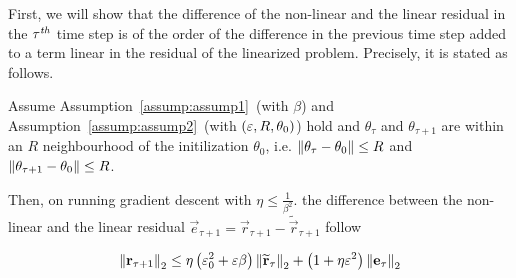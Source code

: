 \documentclass[a4paper]{article}
\let\temp\epsilon
\let\epsilon\varepsilon
\let\varepsilon\temp
\begin{document}
First, we will show that the difference of the non-linear and the
linear residual in the $\tau^{\it th}$ time step is of the order of
the difference in the previous time step added to a term linear in the
residual of the linearized problem. Precisely, it is stated as
follows.

\begin{lem}[Lemma 6.7]\label{lem:pert-one-step}
  Assume Assumption~\ref{assump:assump1}~(with $\beta$) and
  Assumption~\ref{assump:assump2}~(with $\br{\epsilon,R,\theta_0}$) hold and
  $\theta_\tau$ and $\theta_{\tau + 1}$ are within an $R$
  neighbourhood of the initilization $\theta_0$,
  i.e. $\mathrm{\left\lVert\theta_\tau - \theta_0\right\rVert}\le R$ and
  $\mathrm{\left\lVert\theta_{\tau+1}- \theta_0\right\rVert}\le R$.

  Then, on running gradient
  descent with $\eta\le \frac{1}{\beta^2}$. the difference between the
  non-linear and the linear residual $\vec{e}_{\tau+1} =
  \vec{r}_{\tau+1} - \widetilde{\vec{r}}_{\tau+1}$ follow

  \begin{equation}
    \label{eq:growth_of_res_error}
    \norm{\vec{r}_{\tau+1}}_2 \le \eta\br{\epsilon_0^2 +
      \epsilon\beta}\norm{\widetilde{\vec{r}}_\tau}_2 + \br{1 + \eta\epsilon^2}\norm{\vec{e}_\tau}_2
  \end{equation}
\end{lem}
\end{document}
